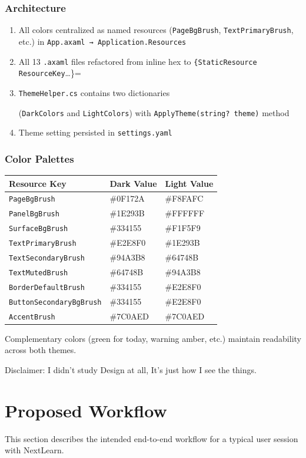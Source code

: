 \documentclass[14pt]{article}
\begin{document}
\subsubsection{Architecture}
\label{sec:org244594b}
\begin{enumerate}
\item All colors centralized as named resources (\texttt{PageBgBrush},
\texttt{TextPrimaryBrush}, etc.) in \texttt{App.axaml → Application.Resources}
\item All 13 \texttt{.axaml} files refactored from inline hex to
\texttt{\{StaticResource ResourceKey}\ldots{}\}=
\item \texttt{ThemeHelper.cs} contains two dictionaries

(\texttt{DarkColors} and \texttt{LightColors}) with \texttt{ApplyTheme(string? theme)} method
\item Theme setting persisted in \texttt{settings.yaml}
\end{enumerate}
\subsubsection{Color Palettes}
\label{sec:org71177f7}
\begin{center}
\begin{tabular}{lll}
Resource Key & Dark Value & Light Value\\
\hline
\texttt{PageBgBrush} & \#0F172A & \#F8FAFC\\
\texttt{PanelBgBrush} & \#1E293B & \#FFFFFF\\
\texttt{SurfaceBgBrush} & \#334155 & \#F1F5F9\\
\texttt{TextPrimaryBrush} & \#E2E8F0 & \#1E293B\\
\texttt{TextSecondaryBrush} & \#94A3B8 & \#64748B\\
\texttt{TextMutedBrush} & \#64748B & \#94A3B8\\
\texttt{BorderDefaultBrush} & \#334155 & \#E2E8F0\\
\texttt{ButtonSecondaryBgBrush} & \#334155 & \#E2E8F0\\
\texttt{AccentBrush} & \#7C0AED & \#7C0AED\\
\end{tabular}
\end{center}

Complementary colors (green for today, warning amber, etc.) maintain
readability across both themes.

Disclaimer: I didn't study Design at all, It's just how I see the things.
\newpage
\section{Proposed Workflow}
\label{sec:orgcd3e888}
This section describes the intended end-to-end workflow for a typical
user session with NextLearn.
\end{document}
